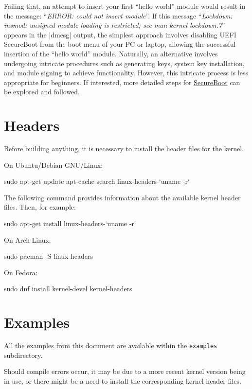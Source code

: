 \documentclass[10pt, oneside]{book}
\begin{document}
\begin{enumerate}
        Failing that, an attempt to insert your first ``hello world'' module would result in the message: ``\emph{ERROR: could not insert module}''.
        If this message ``\emph{Lockdown: insmod: unsigned module loading is restricted;
        see man kernel lockdown.7}'' appears in the \sh|dmesg| output,
        the simplest approach involves disabling UEFI SecureBoot from the boot menu of your PC or laptop,
        allowing the successful insertion of the ``hello world'' module.
        Naturally, an alternative involves undergoing intricate procedures such as generating keys, system key installation,
        and module signing to achieve functionality.
        However, this intricate process is less appropriate for beginners. If interested,
        more detailed steps for \href{https://wiki.debian.org/SecureBoot}{SecureBoot} can be explored and followed.
\end{enumerate}

\section{Headers}
\label{sec:headers}
Before building anything, it is necessary to install the header files for the kernel.

On Ubuntu/Debian GNU/Linux:
\begin{codebash}
sudo apt-get update
apt-cache search linux-headers-`uname -r`
\end{codebash}

The following command provides information about the available kernel header files.
Then, for example:
\begin{codebash}
sudo apt-get install linux-headers-`uname -r`
\end{codebash}

On Arch Linux:
\begin{codebash}
sudo pacman -S linux-headers
\end{codebash}

On Fedora:
\begin{codebash}
sudo dnf install kernel-devel kernel-headers
\end{codebash}

\section{Examples}
\label{sec:examples}
All the examples from this document are available within the \verb|examples| subdirectory.

Should compile errors occur, it may be due to a more recent kernel version being in use,
or there might be a need to install the corresponding kernel header files.
\end{document}
